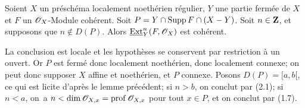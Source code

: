 \begin{proposition}\label{VII.2.3} Soient $X$ un pr\'esch\'ema localement noeth\'erien r\'egulier, $Y$ une partie ferm\'ee de $X$ et $F$ un $\mathscr{O}_X$-Module coh\'erent. Soit $P = Y \cap \operatorname{Supp} F \cap (X - Y)$. Soit $n \in \mathbf{Z}$, et supposons que $n \not\in D(P)$. Alors $\mathop{\underline{\mathrm{Ext}}}\nolimits^n_Y (F, \mathscr{O}_X)$ est coh\'erent.
\end{proposition}

La conclusion est locale et les hypoth\`eses se conservent par restriction \`a un ouvert. Or $P$ est ferm\'e donc localement noeth\'erien, donc localement connexe; on peut donc supposer $X$ affine et noeth\'erien, et $P$ connexe. Posons $D(P) = [a, b[$, ce qui est licite d'apr\`es le lemme pr\'ec\'edent; si $n> b$, on conclut par (2.1); si $n < a$, on~a \hbox{$n < \dim {\mathscr O}_{X, x} = \operatorname{prof} {\mathscr O}_{X, x}$} pour tout $x \in P$, et on conclut par (1.7).

